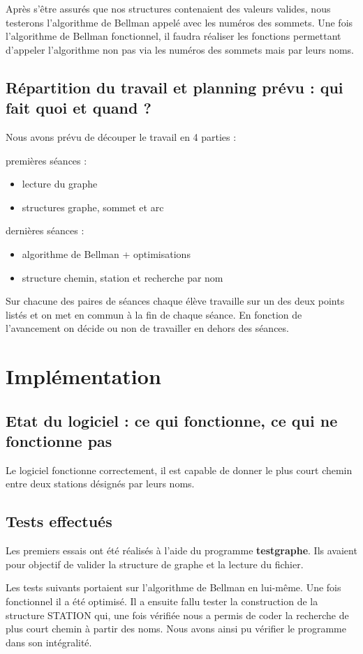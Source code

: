 \documentclass{report}
\begin{document}
Après s’être assurés que nos structures contenaient des valeurs valides, nous testerons l’algorithme de Bellman appelé avec les numéros des sommets.
Une fois l’algorithme de Bellman fonctionnel, il faudra réaliser les fonctions permettant d’appeler l’algorithme non pas via les numéros des sommets mais par leurs noms.

\section{Répartition du travail et planning prévu : qui fait quoi et quand ?}

Nous avons prévu de découper le travail en 4 parties :

 premières séances :
\begin{itemize}
\item lecture du graphe
\item structures graphe, sommet et arc
\end{itemize}

 dernières séances :
\begin{itemize}
\item algorithme de Bellman + optimisations
\item structure chemin, station et recherche par nom
\end{itemize}
\bigskip
Sur chacune des paires de séances chaque élève travaille sur un des deux points listés et on met en commun à la fin de chaque séance. En fonction de l'avancement on décide ou non de travailler en dehors des séances.

\chapter{Implémentation}
\section{Etat du logiciel : ce qui fonctionne, ce qui ne fonctionne pas}
Le logiciel fonctionne correctement, il est capable de donner le plus court chemin entre deux stations désignés par leurs noms.
\section{Tests effectués}
Les premiers essais ont été réalisés à l'aide du programme \textbf{testgraphe}. Ils avaient pour objectif de valider la structure de graphe et la lecture du fichier.

Les tests suivants portaient sur l'algorithme de Bellman en lui-même. Une fois fonctionnel il a été optimisé.
Il a ensuite fallu tester la construction de la structure STATION qui, une fois vérifiée nous a permis de coder la recherche de plus court chemin à partir des noms. Nous avons ainsi pu vérifier le programme dans son intégralité.
\end{document}
